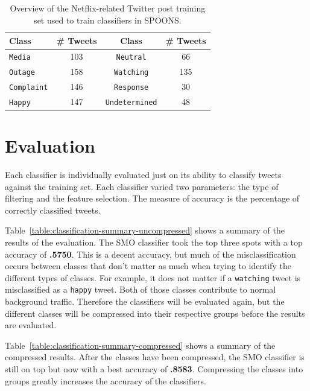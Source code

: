 \documentclass[12pt]{ucthesis}
\begin{document}
\begin{table}
   \begin{center}
      \begin{tabular}{|l|c|c|c|}
         \hline
         Class  & \# Tweets & Class & \# Tweets
         \tabularnewline\hline
         \texttt{Media} & 103 & \texttt{Neutral} & 66
         \tabularnewline\hline
         \texttt{Outage} & 158  & \texttt{Watching} &  135
         \tabularnewline\hline
         \texttt{Complaint}  & 146 &  \texttt{Response} &  30
         \tabularnewline\hline
         \texttt{Happy}  & 147  & \texttt{Undetermined}  & 48
         \tabularnewline\hline
      \end{tabular}
      \caption[Netflix-related Twitter Traffic]{Overview of the Netflix-related Twitter post training set used to train classifiers in SPOONS.}
      \label{table:classCounts}
   \end{center}
\end{table}

\chapter{Evaluation}
\label{class-evaluation}
Each classifier is individually evaluated just on its ability to classify tweets against the training set.
Each classifier varied two parameters: the type of filtering and the feature selection.
The measure of accuracy is the percentage of correctly classified tweets.

Table~\ref{table:classification-summary-uncompressed} shows a summary of the results of the evaluation.
The SMO classifier took the top three spots with a top accuracy of \textbf{.5750}.
This is a decent accuracy, but much of the misclassification occurs between classes that don't matter
as much when trying to identify the different types of classes. For example, it does not matter if
a \texttt{watching} tweet is misclassified as a \texttt{happy} tweet. Both of those classes contribute to
normal background traffic. Therefore the classifiers will be evaluated again, but the different classes
will be compressed into their respective groups before the results are evaluated.



Table~\ref{table:classification-summary-compressed} shows a summary of the compressed results.
After the classes have been compressed, the SMO classifier is still on top but now with a best accuracy
of \textbf{.8583}. Compressing the classes into groups greatly increases the accuracy of the classifiers.
\end{document}
